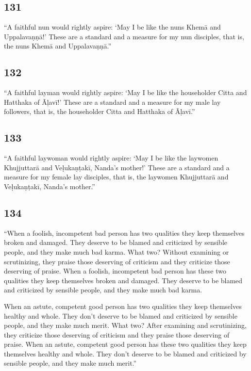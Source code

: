 \documentclass[12pt,openany]{book}%
\begin{document}
\subsection*{131 }

“A faithful nun would rightly aspire: ‘May I be like the nuns \textsanskrit{Khemā} and \textsanskrit{Uppalavaṇṇā}!’ These are a standard and a measure for my nun disciples, that is, the nuns \textsanskrit{Khemā} and \textsanskrit{Uppalavaṇṇā}.” 

\subsection*{132 }

“A faithful layman would rightly aspire: ‘May I be like the householder Citta and Hatthaka of \textsanskrit{Ãḷavī}!’ These are a standard and a measure for my male lay followers, that is, the householder Citta and Hatthaka of \textsanskrit{Ãḷavī}.” 

\subsection*{133 }

“A faithful laywoman would rightly aspire: ‘May I be like the laywomen \textsanskrit{Khujjuttarā} and \textsanskrit{Veḷukaṇṭakī}, Nanda’s mother!’ These are a standard and a measure for my female lay disciples, that is, the laywomen \textsanskrit{Khujjuttarā} and \textsanskrit{Veḷukaṇṭakī}, Nanda’s mother.” 

\subsection*{134 }

“When a foolish, incompetent bad person has two qualities they keep themselves broken and damaged. They deserve to be blamed and criticized by sensible people, and they make much bad karma. What two? Without examining or scrutinizing, they praise those deserving of criticism and they criticize those deserving of praise. When a foolish, incompetent bad person has these two qualities they keep themselves broken and damaged. They deserve to be blamed and criticized by sensible people, and they make much bad karma. 

When an astute, competent good person has two qualities they keep themselves healthy and whole. They don’t deserve to be blamed and criticized by sensible people, and they make much merit. What two? After examining and scrutinizing, they criticize those deserving of criticism and they praise those deserving of praise. When an astute, competent good person has these two qualities they keep themselves healthy and whole. They don’t deserve to be blamed and criticized by sensible people, and they make much merit.” 
\end{document}
